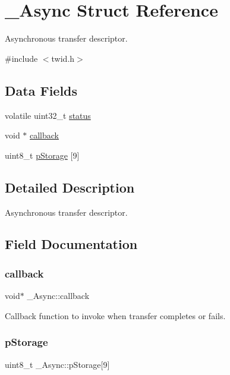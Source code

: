 \hypertarget{struct__Async}{}\section{\+\_\+\+Async Struct Reference}
\label{struct__Async}


Asynchronous transfer descriptor.  




{\ttfamily \#include $<$twid.\+h$>$}

\subsection*{Data Fields}
\begin{DoxyCompactItemize}
\item 
volatile uint32\+\_\+t \mbox{\hyperlink{struct__Async_a1badababf6940f73d85c383b5a1422f2}{status}}
\item 
void $\ast$ \mbox{\hyperlink{struct__Async_a0395232a6d9a2dc2bcc06edd1e564bc4}{callback}}
\item 
uint8\+\_\+t \mbox{\hyperlink{struct__Async_a527febd750f375ca53b96738879e525d}{p\+Storage}} \mbox{[}9\mbox{]}
\end{DoxyCompactItemize}


\subsection{Detailed Description}
Asynchronous transfer descriptor. 

\subsection{Field Documentation}
\mbox{\label{struct__Async_a0395232a6d9a2dc2bcc06edd1e564bc4}} 
\subsubsection{\texorpdfstring{callback}{callback}}
{\footnotesize\ttfamily void$\ast$ \+\_\+\+Async\+::callback}

Callback function to invoke when transfer completes or fails. \mbox{\label{struct__Async_a527febd750f375ca53b96738879e525d}} 
\subsubsection{\texorpdfstring{pStorage}{pStorage}}
{\footnotesize\ttfamily uint8\+\_\+t \+\_\+\+Async\+::p\+Storage\mbox{[}9\mbox{]}}

